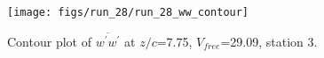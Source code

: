 \begin{figure}[H]
\centering
\texttt{[image: figs/run\_28/run\_28\_ww\_contour]}
\caption{Contour plot of $\overline{w^\prime w^\prime}$ at $z/c$=7.75, $V_{free}$=29.09, station 3.}
\label{fig:run_28_ww_contour}
\end{figure}


